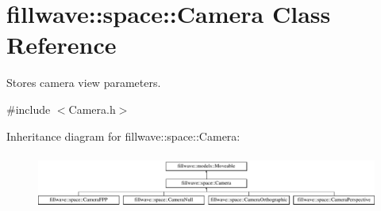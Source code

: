 \hypertarget{classfillwave_1_1space_1_1Camera}{}\section{fillwave\+:\+:space\+:\+:Camera Class Reference}
\label{classfillwave_1_1space_1_1Camera}


Stores camera view parameters.  




{\ttfamily \#include $<$Camera.\+h$>$}

Inheritance diagram for fillwave\+:\+:space\+:\+:Camera\+:\begin{figure}[H]
\begin{center}
\leavevmode
\includegraphics[height=1.842105cm]{classfillwave_1_1space_1_1Camera}
\end{center}
\end{figure}
